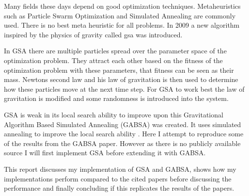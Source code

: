 Many fields these days depend on good optimization techniques. Metaheuristics such as Particle Swarm Optimization and Simulated Annealing are commonly used. There is no best meta heuristic for all problems. In 2009 a new algorithm inspired by the physics of gravity called \ac{gsa} was introduced\cite{GSA}. 

In GSA there are multiple particles spread over the parameter space of the optimization problem. They attract each other based on the fitness of the optimization problem with these parameters, that fitness can be seen as their mass. Newtons second law and his law of gravitation is then used to determine how these particles move at the next time step. For GSA to work best the law of gravitation is modified and some randomness is introduced into the system.

GSA is weak in its local search ability to improve upon this Gravitational Algorithm Based Simulated Annealing (GABSA) was created. It uses simulated annealing to improve the local search ability \cite{GABSA}. Here I attempt to reproduce some of the results from the GABSA paper. However as there is no publicly available source I will first implement GSA before extending it with GABSA. 

This report discusses my implementation of GSA and GABSA, shows how my implementations perform compared to the cited papers before discussing the performance and finally concluding if this replicates the results of the papers.
